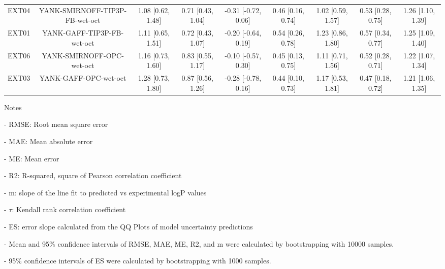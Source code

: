 \documentclass{article}
\begin{document}
\begin{center}
\begin{longtable}{|ccccccccc|}
 EXT04 &  YANK-SMIRNOFF-TIP3P-FB-wet-oct &  1.08 [0.62, 1.48] &  0.71 [0.43, 1.04] &  -0.31 [-0.72, 0.06] &  0.46 [0.16, 0.74] &  1.02 [0.59, 1.57] &  0.53 [0.28, 0.75] &  1.26 [1.10, 1.39] \\
 EXT01 &      YANK-GAFF-TIP3P-FB-wet-oct &  1.11 [0.65, 1.51] &  0.72 [0.43, 1.07] &  -0.20 [-0.64, 0.19] &  0.54 [0.26, 0.78] &  1.23 [0.86, 1.80] &  0.57 [0.34, 0.77] &  1.25 [1.09, 1.40] \\
 EXT06 &       YANK-SMIRNOFF-OPC-wet-oct &  1.16 [0.73, 1.60] &  0.83 [0.55, 1.17] &  -0.10 [-0.57, 0.30] &  0.45 [0.13, 0.75] &  1.11 [0.71, 1.56] &  0.52 [0.28, 0.71] &  1.22 [1.07, 1.34] \\
 EXT03 &           YANK-GAFF-OPC-wet-oct &  1.28 [0.73, 1.80] &  0.87 [0.56, 1.26] &  -0.28 [-0.78, 0.16] &  0.44 [0.10, 0.73] &  1.17 [0.53, 1.81] &  0.47 [0.18, 0.72] &  1.21 [1.06, 1.35] \\
\end{longtable}
\end{center}

Notes

- RMSE: Root mean square error

- MAE: Mean absolute error

- ME: Mean error

- R2: R-squared, square of Pearson correlation coefficient

- m: slope of the line fit to predicted vs experimental logP values

- $\tau$:  Kendall rank correlation coefficient

- ES: error slope calculated from the QQ Plots of model uncertainty predictions

- Mean and 95\% confidence intervals of RMSE, MAE, ME, R2, and m were calculated by bootstrapping with 10000 samples.

- 95\% confidence intervals of ES were calculated by bootstrapping with 1000 samples.\end{document}
\end{document}
